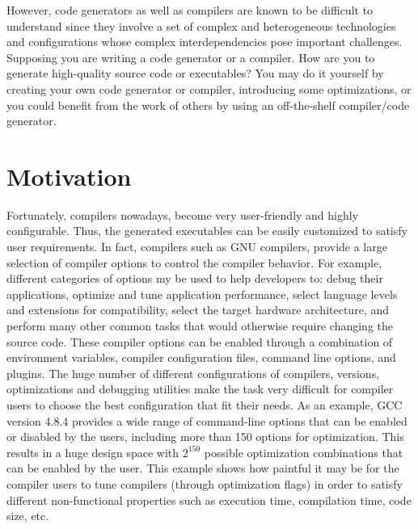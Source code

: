 However, code generators as well as compilers are known to be difficult to understand since they involve a set of complex and heterogeneous technologies and configurations whose complex interdependencies pose important challenges. 
Supposing you are writing a code generator or a compiler. How are you to generate high-quality source code or executables? You may do it yourself by creating your own code generator or compiler, introducing some optimizations, or you could benefit from the work of others by using an off-the-shelf compiler/code generator.


\section{Motivation}

Fortunately, compilers nowadays, become very user-friendly and highly configurable\cite{fursin2008milepost}. Thus, the generated executables can be easily customized to satisfy user requirements. In fact, compilers such as GNU compilers, provide a large selection of compiler options to control the compiler behavior. For example, different categories of options my be used to help developers to: debug their applications, optimize and tune application performance, select language levels and extensions for compatibility, select the target hardware architecture, and perform many other common tasks that would otherwise require changing the source code.
These compiler options can be enabled through a combination of environment variables, compiler configuration files, command line options, and plugins. 
The huge number of different configurations of compilers, versions, optimizations and debugging utilities make the task very difficult for compiler users to choose the best configuration that fit their needs. As an example, GCC version 4.8.4 provides a wide range of command-line options that can be enabled or disabled by the users, including more than 150 options for optimization. This results in a huge design space with $2^{150}$ possible optimization combinations that can be enabled by the user.
This example shows how paintful it may be for the compiler users to tune compilers (through optimization flags) in order to satisfy different non-functional properties such as execution time, compilation time, code size, etc.


